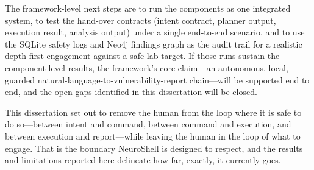 The framework-level next steps are to run the components as one integrated
system, to test the hand-over contracts (intent contract, planner output,
execution result, analysis output) under a single end-to-end scenario, and to
use the SQLite safety logs and Neo4j findings graph as the audit trail for a
realistic depth-first engagement against a safe lab target. If those runs
sustain the component-level results, the framework's core claim---an autonomous,
local, guarded natural-language-to-vulnerability-report chain---will be
supported end to end, and the open gaps identified in this dissertation will be
closed.

This dissertation set out to remove the human from the loop where it is safe to
do so---between intent and command, between command and execution, and between
execution and report---while leaving the human in the loop of what to engage.
That is the boundary NeuroShell is designed to respect, and the results and
limitations reported here delineate how far, exactly, it currently goes.